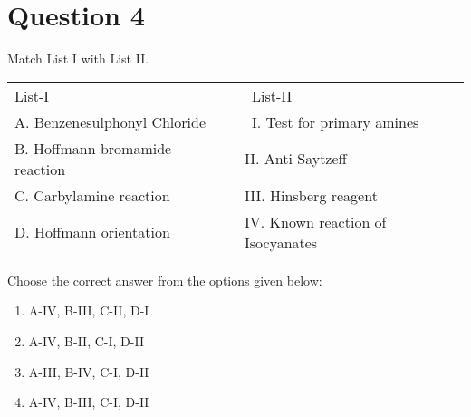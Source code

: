 \documentclass{article}
\begin{document}
\section*{Question 4}
Match List I with List II.\begin{longtable}[]{@{}ll@{}}

\toprule\noalign{}

\endhead

\bottomrule\noalign{}

\endlastfoot

List-I~~ & ~List-II~ \\

A. Benzenesulphonyl Chloride & ~I. Test for primary amines~ \\

B. Hoffmann bromamide reaction~~ & II. Anti Saytzeff~~ \\

C. Carbylamine reaction~ & III. Hinsberg reagent~ \\

D. Hoffmann orientation~ & IV. Known reaction of Isocyanates~ \\

\end{longtable}

Choose the correct answer from the options given below: \newline
\begin{enumerate}[label=(\alph*)]
\item A-IV, B-III, C-II, D-I
\item A-IV, B-II, C-I, D-II
\item A-III, B-IV, C-I, D-II
\item A-IV, B-III, C-I, D-II
\end{enumerate}
\newpage
\end{document}
